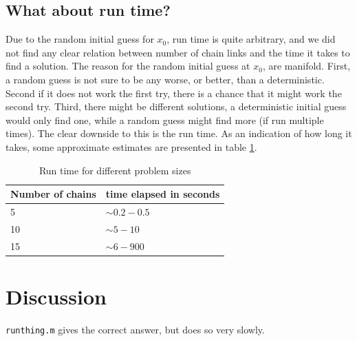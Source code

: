 \subsection{What about run time?}
Due to the random initial guess for $x_0$, run time is quite arbitrary, and we did not find any clear relation between number of chain links and the time it takes to find a solution. The reason for the random initial guess at $x_0$, are manifold. First, a random guess is not sure to be any worse, or better, than a deterministic. Second if it does not work the first try, there is a chance that it might work the second try. Third, there might be different solutions, a deterministic initial guess would only find one, while a random guess might find more (if run multiple times). The clear downside to this is the run time. As an indication of how long it takes, some approximate estimates are presented in table \ref{tab:time}.
\begin{table}[]
\centering
\begin{tabular}{l l}
Number of chains & time elapsed in seconds \\
\hline
5 &  $\sim 0.2-0.5$\\
10 & $\sim 5-10 $ \\
15 & $\sim 6-900$ \\
\end{tabular}
\caption{Run time for different problem sizes}
\label{tab:time}
\end{table}

\section{Discussion}
\texttt{runthing.m} gives the correct answer, but does so very slowly. 